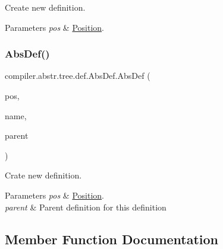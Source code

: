 Create new definition.


\begin{DoxyParams}{Parameters}
{\em pos} & \hyperlink{classcompiler_1_1_position}{Position}. \\
\hline
\end{DoxyParams}
\mbox{\label{classcompiler_1_1abstr_1_1tree_1_1def_1_1_abs_def_a33f65af966d28e0839a033dac9947ca9}} 
\subsubsection{\texorpdfstring{Abs\+Def()}{AbsDef()}\hspace{0.1cm}{\footnotesize\ttfamily [3/3]}}
{\footnotesize\ttfamily compiler.\+abstr.\+tree.\+def.\+Abs\+Def.\+Abs\+Def (\begin{DoxyParamCaption}\item[{\hyperlink{classcompiler_1_1_position}{Position}}]{pos,  }\item[{String}]{name,  }\item[{\hyperlink{classcompiler_1_1abstr_1_1tree_1_1def_1_1_abs_def}{Abs\+Def}}]{parent }\end{DoxyParamCaption})}

Crate new definition.


\begin{DoxyParams}{Parameters}
{\em pos} & \hyperlink{classcompiler_1_1_position}{Position}. \\
\hline
{\em parent} & Parent definition for this definition \\
\hline
\end{DoxyParams}


\subsection{Member Function Documentation}
\mbox{\label{classcompiler_1_1abstr_1_1tree_1_1def_1_1_abs_def_a5e60c957f783bf4b1bde9ef7cd4ffe1c}} 
